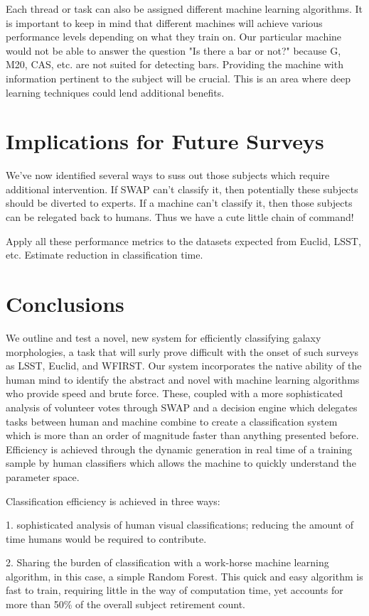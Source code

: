 \documentclass[twocolumn]{aastex6}
\begin{document}
Each thread or task can also be assigned different machine learning algorithms. 
It is important to keep in mind that different machines will achieve various 
performance levels depending on what they train on. Our particular machine would
not be able to answer the question "Is there a bar or not?" because G, M20, CAS, etc.
are not suited for detecting bars. Providing the machine with information 
pertinent to the subject will be crucial. This is an area where deep learning 
techniques could lend additional benefits. 


\section{Implications for Future Surveys}
We've now identified several ways to suss out those subjects which require
additional intervention. If SWAP can't classify it, then potentially these subjects 
should be diverted to experts. If a machine can't classify it, then those subjects
can be relegated back to humans. Thus we have a cute little chain of command!

Apply all these performance metrics to the datasets expected from Euclid, LSST, etc. 
Estimate reduction in classification time. 
\section{Conclusions}

We outline and test a novel, new system for efficiently classifying galaxy morphologies, 
a task that will surly prove difficult with the onset of such surveys as LSST, Euclid, 
and WFIRST. Our system incorporates the native ability of the human mind to identify
the abstract and novel with machine learning algorithms who provide speed and 
brute force. These, coupled with a more sophisticated analysis of volunteer votes 
through SWAP and a decision engine which delegates tasks between human and 
machine combine to create a classification system which is more than an order of
magnitude faster than anything presented before. Efficiency is achieved through 
the dynamic generation in real time of a training sample by human classifiers which
allows the machine to quickly understand the parameter space. 

Classification efficiency is achieved in three ways: 

1. sophisticated analysis of human visual classifications; reducing the amount of time
humans would be required to contribute. 

2. Sharing the burden of classification with a work-horse machine learning algorithm, 
in this case, a simple Random Forest. This quick and easy algorithm is fast to train, 
requiring little in the way of computation time, yet accounts for more than 50\% of 
the overall subject retirement count. 
\end{document}
